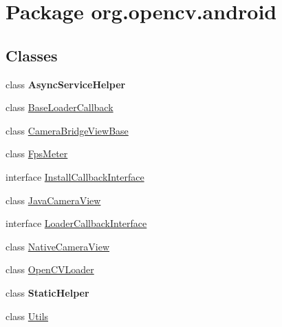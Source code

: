 \hypertarget{namespaceorg_1_1opencv_1_1android}{}\section{Package org.\+opencv.\+android}
\label{namespaceorg_1_1opencv_1_1android}
\subsection*{Classes}
\begin{DoxyCompactItemize}
\item 
class {\bfseries Async\+Service\+Helper}
\item 
class \mbox{\hyperlink{classorg_1_1opencv_1_1android_1_1_base_loader_callback}{Base\+Loader\+Callback}}
\item 
class \mbox{\hyperlink{classorg_1_1opencv_1_1android_1_1_camera_bridge_view_base}{Camera\+Bridge\+View\+Base}}
\item 
class \mbox{\hyperlink{classorg_1_1opencv_1_1android_1_1_fps_meter}{Fps\+Meter}}
\item 
interface \mbox{\hyperlink{interfaceorg_1_1opencv_1_1android_1_1_install_callback_interface}{Install\+Callback\+Interface}}
\item 
class \mbox{\hyperlink{classorg_1_1opencv_1_1android_1_1_java_camera_view}{Java\+Camera\+View}}
\item 
interface \mbox{\hyperlink{interfaceorg_1_1opencv_1_1android_1_1_loader_callback_interface}{Loader\+Callback\+Interface}}
\item 
class \mbox{\hyperlink{classorg_1_1opencv_1_1android_1_1_native_camera_view}{Native\+Camera\+View}}
\item 
class \mbox{\hyperlink{classorg_1_1opencv_1_1android_1_1_open_c_v_loader}{Open\+C\+V\+Loader}}
\item 
class {\bfseries Static\+Helper}
\item 
class \mbox{\hyperlink{classorg_1_1opencv_1_1android_1_1_utils}{Utils}}
\end{DoxyCompactItemize}
